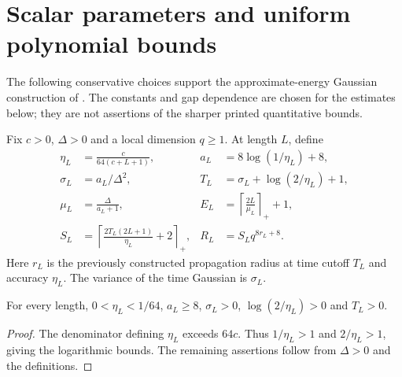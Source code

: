 \section{Scalar parameters and uniform polynomial bounds}
\label{sec:huang_filter_parameters}

The following conservative choices support the approximate-energy Gaussian
construction of \cite[Section~5.4, Lemmas~18--19]{Huang2015GroundState}.
The constants and gap dependence are chosen for the estimates below; they are
not assertions of the sharper printed quantitative bounds.

\begin{definition}
    \label{def:huang_filter_parameters}
    \leanok
    Fix $c>0$, $\Delta>0$ and a local dimension $q\ge1$. At length $L$, define
    \begin{align}
        \eta_L   & =\frac{c}{64(c+L+1)},                                  &
        a_L      & =8\log(1/\eta_L)+8,                                      \\
        \sigma_L & =a_L/\Delta^2,                                         &
        T_L      & =\sigma_L+\log(2/\eta_L)+1,                              \\
        \mu_L    & =\frac{\Delta}{a_L+1},                                 &
        E_L      & =\left\lceil\frac{2L}{\mu_L}\right\rceil_++1,            \\
        S_L      & =\left\lceil\frac{2T_L(2L+1)}{\eta_L}+2\right\rceil_+, &
        R_L      & =S_Lq^{8r_L+8}.
    \end{align}
    Here $r_L$ is the previously constructed propagation radius at time cutoff
    $T_L$ and accuracy $\eta_L$. The variance of the time Gaussian is $\sigma_L$.
\end{definition}

\begin{lemma}
    \label{thm:huang_filter_parameter_positivity}
    \leanok
    For every length, $0<\eta_L<1/64$, $a_L\ge8$, $\sigma_L>0$,
    $\log(2/\eta_L)>0$ and $T_L>0$.
\end{lemma}
\begin{proof}
    \leanok
    The denominator defining $\eta_L$ exceeds $64c$. Thus $1/\eta_L>1$
    and $2/\eta_L>1$, giving the logarithmic bounds. The remaining assertions
    follow from $\Delta>0$ and the definitions.
\end{proof}

